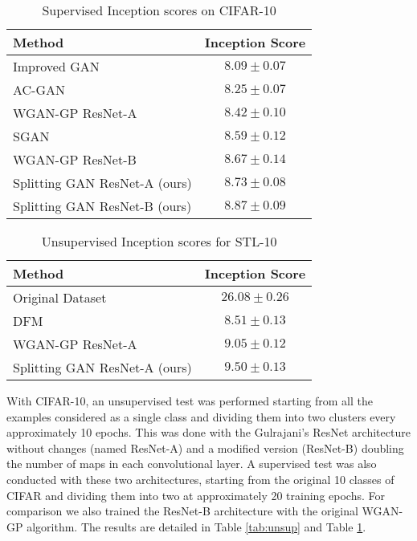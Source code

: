 \documentclass[times,twocolumn]{article}
\begin{document}
\begin{table}
\begin{center}
\caption{Supervised Inception scores on CIFAR-10}
\begin{tabular}{lc}
\toprule
Method                                 &    Inception Score \\
\midrule
Improved GAN \cite{Salimans2016}      &    $8.09 \pm 0.07$ \\
AC-GAN \cite{Odena2017}               &    $8.25 \pm 0.07$ \\
WGAN-GP ResNet-A \cite{Gulrajani2017} &    $8.42 \pm 0.10$ \\
SGAN \cite{Huang2016}                 &    $8.59 \pm 0.12$ \\
WGAN-GP ResNet-B                      &    $8.67 \pm 0.14$ \\
Splitting GAN ResNet-A (ours)           &    $8.73 \pm 0.08$ \\
Splitting GAN ResNet-B (ours)           &    $\bm{8.87 \pm 0.09}$ \\
\bottomrule
\end{tabular}
\end{center}
\label{tab:sup}
\end{table}

\begin{table}
\begin{center}
\caption{Unsupervised Inception scores for STL-10}
\begin{tabular}{lc}
\toprule
Method                                   &   Inception Score \\
\midrule
Original Dataset \cite{WardeFarley2017}  &  $26.08 \pm 0.26$ \\[5pt]
DFM \cite{WardeFarley2017}               &  $ 8.51 \pm 0.13$ \\
WGAN-GP ResNet-A                         &  $ 9.05 \pm 0.12$ \\
Splitting GAN ResNet-A (ours)            &  $\bm{9.50 \pm 0.13}$ \\
\bottomrule
\end{tabular}
\end{center}
\label{tab:sup_stl10}
\end{table}

With CIFAR-10, an unsupervised test was performed starting from all the examples considered as a single class and dividing them into two clusters every approximately 10 epochs.  This was done with the Gulrajani's ResNet architecture without changes (named ResNet-A) and a modified version (ResNet-B) doubling the number of maps in each convolutional layer. A supervised test was also conducted with these two architectures, starting from the original 10 classes of CIFAR and dividing them into two at approximately 20 training epochs. For comparison we also trained the ResNet-B architecture with the original WGAN-GP algorithm. The results are detailed in Table \ref{tab:unsup} and Table \ref{tab:sup}. 
\end{document}
